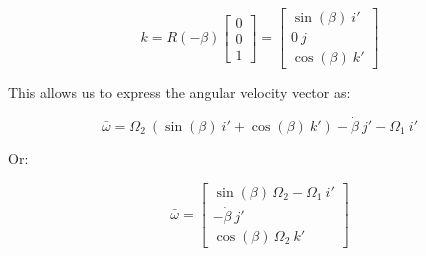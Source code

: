 \documentclass[12pt, letterpaper]{../assignment}
\begin{document}
$$ k = R(-\beta)  \left[\begin{array}{ccc} 0\\ 0\\ 1 \end{array}\right]
= \left[\begin{array}{r} \sin\left(\beta\right)\ i' \\ 0 \ j\\ \cos\left(\beta\right)\ k' \end{array}\right] $$

This allows us to express the angular velocity vector as:

$$ \bar{\omega} = \Omega_2\ \left( \sin(\beta) \ i' + \cos(\beta) \ k' \right)
                -\dot{\beta}\ j'
                - \Omega_1\ i' $$

Or:

$$ \bar{\omega} =
\left[\begin{array}{r} \sin\left(\beta\right)\,\Omega _{2}-\Omega _{1}\ i'\\
    -\dot{\beta}\ j'\\ \cos\left(\beta\right)\,\Omega _{2}\ k' \end{array}\right] $$


\end{document}
